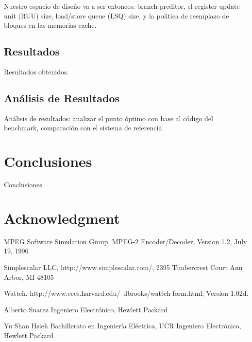 \documentclass[journal]{IEEEtran}
\begin{document}
Nuestro espacio de dise\~no va a ser entonces: branch preditor, el register update unit (RUU) size, load/store queue (LSQ) size, y la politica de reemplazo de bloques en las memorias cache.

\subsection{Resultados}
Resultados obtenidos.

\subsection{An\'{a}lisis de Resultados}
An\'{a}lisis de resultados: analizar el punto \'{o}ptimo con base al c\'{o}digo del benchmark, comparaci\'{o}n con el sistema de referencia.

\section{Conclusiones}
Conclusiones.

\section*{Acknowledgment}

\begin{thebibliography}{1}
MPEG Software Simulation Group, MPEG-2 Encoder/Decoder, Version 1.2, July 19, 1996

Simplescalar LLC, http://www.simplescalar.com/, 2395 Timbercrest Court Ann Arbor, MI 48105

Wattch, http://www.eecs.harvard.edu/~dbrooks/wattch-form.html, Version 1.02d.

\end{thebibliography}

\begin{IEEEbiographynophoto}{Alberto Suarez}
Ingeniero Electr\'{o}nico, Hewlett Packard
\end{IEEEbiographynophoto}

\begin{IEEEbiographynophoto}{Yu Shan Hsieh}
Bachillerato en Ingenier\'{i}a El\'{e}ctrica, UCR
Ingeniero Electr\'{o}nico, Hewlett Packard
\end{IEEEbiographynophoto}
\end{document}

